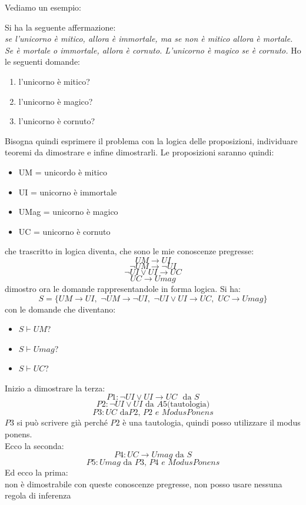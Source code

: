 \documentclass[a4paper,12pt, oneside]{book}
\begin{document}
Vediamo un esempio:
\begin{esempio}
	Si ha la seguente affermazione:\\
	\textit{se l'unicorno è mitico, allora è immortale, ma se non è mitico allora è mortale. Se è mortale o immortale, allora è cornuto. L'unicorno è magico se è cornuto.} Ho le seguenti domande:
	\begin{enumerate}
		\item l'unicorno è mitico?
		\item l'unicorno è magico?
		\item l'unicorno è cornuto?
	\end{enumerate}
	Bisogna quindi esprimere il problema con la logica delle proposizioni, individuare teoremi da dimostrare e infine dimostrarli. Le proposizioni saranno quindi:
	\begin{itemize}
		\item UM = unicordo è mitico
		\item UI = unicorno è immortale
		\item UMag = unicorno è magico
		\item UC = unicorno è cornuto
	\end{itemize}
	che trascritto in logica diventa, che sono le mie conoscenze pregresse:
	$$UM\to UI$$
	$$\neg UM \to \neg UI$$
	$$\neg UI\vee UI\to UC$$
	$$UC\to Umag$$
	dimostro ora le domande rappresentandole in forma logica. Si ha:
	$$S=\{UM\to UI,\,\,\neg UM \to \neg UI,\,\,\neg UI\vee UI\to UC,\,\,UC\to Umag\}$$
	con le domande che diventano:
	\begin{itemize}
		\item $S\vdash UM$?
		\item $S\vdash Umag$?
		\item $S\vdash UC$?
	\end{itemize}
	\newpage
	Inizio a dimostrare la terza:\\
	$$P1: \neg UI\vee UI\to UC\,\, \mbox{ da }S$$
	$$P2: \neg UI\vee UI \mbox{ da }A5 \mbox{(tautologia)}$$
	$$P3: UC\mbox{ da}P2,\,P2\,\, e\,\, ModusPonens$$
	$P3$ si può scrivere già perché $P2$ è una tautologia, quindi posso utilizzare il modus ponens.\\
	Ecco la seconda:\\
	$$P4: UC\to Umag \mbox{ da }S$$
	$$P5: Umag \mbox{ da }P3,\,P4\,\, e\,\, ModusPonens$$
	Ed ecco la prima:\\
	non è dimostrabile con queste conoscenze pregresse, non posso usare nessuna regola di inferenza
\end{esempio}
\end{document}
